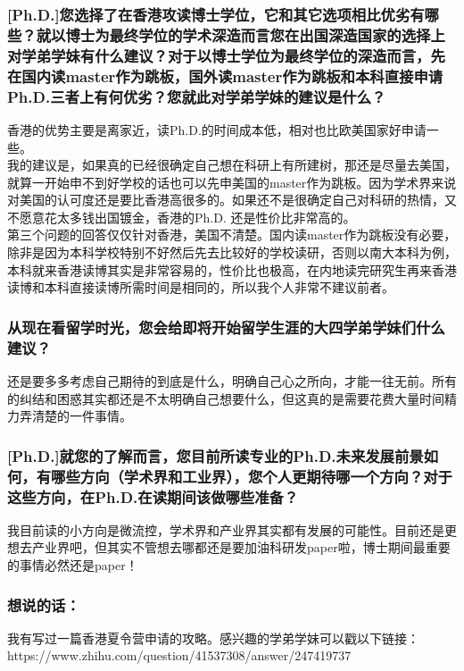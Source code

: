 \documentclass[a4paper,UTF8]{book}
\begin{document}
    \subsubsection*{[Ph.D.]您选择了在香港攻读博士学位，它和其它选项相比优劣有哪些？就以博士为最终学位的学术深造而言您在出国深造国家的选择上对学弟学妹有什么建议？对于以博士学位为最终学位的深造而言，先在国内读master作为跳板，国外读master作为跳板和本科直接申请Ph.D.三者上有何优劣？您就此对学弟学妹的建议是什么？}
    香港的优势主要是离家近，读Ph.D.的时间成本低，相对也比欧美国家好申请一些。\\
    我的建议是，如果真的已经很确定自己想在科研上有所建树，那还是尽量去美国，就算一开始申不到好学校的话也可以先申美国的master作为跳板。因为学术界来说对美国的认可度还是要比香港高很多的。如果还不是很确定自己对科研的热情，又不愿意花太多钱出国镀金，香港的Ph.D. 还是性价比非常高的。\\
    第三个问题的回答仅仅针对香港，美国不清楚。国内读master作为跳板没有必要，除非是因为本科学校特别不好然后先去比较好的学校读研，否则以南大本科为例，本科就来香港读博其实是非常容易的，性价比也极高，在内地读完研究生再来香港读博和本科直接读博所需时间是相同的，所以我个人非常不建议前者。

    \subsubsection*{从现在看留学时光，您会给即将开始留学生涯的大四学弟学妹们什么建议？}
    还是要多多考虑自己期待的到底是什么，明确自己心之所向，才能一往无前。所有的纠结和困惑其实都还是不太明确自己想要什么，但这真的是需要花费大量时间精力弄清楚的一件事情。

    \subsubsection*{[Ph.D.]就您的了解而言，您目前所读专业的Ph.D.未来发展前景如何，有哪些方向（学术界和工业界），您个人更期待哪一个方向？对于这些方向，在Ph.D.在读期间该做哪些准备？}
    我目前读的小方向是微流控，学术界和产业界其实都有发展的可能性。目前还是更想去产业界吧，但其实不管想去哪都还是要加油科研发paper啦，博士期间最重要的事情必然还是paper！

    \subsubsection{想说的话：}
    我有写过一篇香港夏令营申请的攻略。感兴趣的学弟学妹可以戳以下链接：\\
    https://www.zhihu.com/question/41537308/answer/247419737
    
\end{document}
